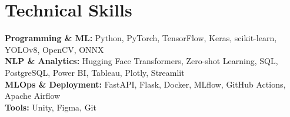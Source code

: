 \documentclass[11pt,a4paper]{article}
\begin{document}
\section*{Technical Skills}
\textbf{Programming \& ML:} Python, PyTorch, TensorFlow, Keras, scikit-learn, YOLOv8, OpenCV, ONNX\\
\textbf{NLP \& Analytics:} Hugging Face Transformers, Zero-shot Learning, SQL, PostgreSQL, Power BI, Tableau, Plotly, Streamlit\\
\textbf{MLOps \& Deployment:} FastAPI, Flask, Docker, MLflow, GitHub Actions, Apache Airflow\\
\textbf{Tools:} Unity, Figma, Git
\end{document}
